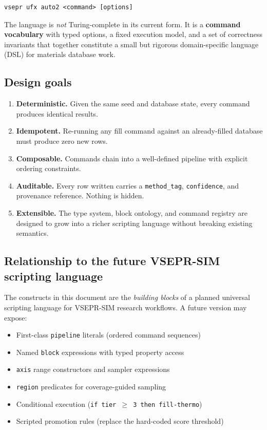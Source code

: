 \documentclass[11pt,letterpaper]{article}
\begin{document}
\begin{lstlisting}
vsepr ufx auto2 <command> [options]
\end{lstlisting}

The language is \emph{not} Turing-complete in its current form.  It is a
\textbf{command vocabulary} with typed options, a fixed execution model, and
a set of correctness invariants that together constitute a small but rigorous
domain-specific language (DSL) for materials database work.

\subsection{Design goals}

\begin{enumerate}[leftmargin=2em]
  \item \textbf{Deterministic.}  Given the same seed and database state,
		every command produces identical results.
  \item \textbf{Idempotent.}  Re-running any fill command against an
		already-filled database must produce zero new rows.
  \item \textbf{Composable.}  Commands chain into a well-defined pipeline
		with explicit ordering constraints.
  \item \textbf{Auditable.}  Every row written carries a \texttt{method\_tag},
		\texttt{confidence}, and provenance reference.  Nothing is hidden.
  \item \textbf{Extensible.}  The type system, block ontology, and command
		registry are designed to grow into a richer scripting language
		without breaking existing semantics.
\end{enumerate}

\subsection{Relationship to the future VSEPR-SIM scripting language}

The constructs in this document are the \emph{building blocks} of a planned
universal scripting language for VSEPR-SIM research workflows.  A future
version may expose:

\begin{itemize}
  \item First-class \texttt{pipeline} literals (ordered command sequences)
  \item Named \texttt{block} expressions with typed property access
  \item \texttt{axis} range constructors and sampler expressions
  \item \texttt{region} predicates for coverage-guided sampling
  \item Conditional execution (\texttt{if tier $\geq$ 3 then fill-thermo})
  \item Scripted promotion rules (replace the hard-coded score threshold)
\end{itemize}
\end{document}
